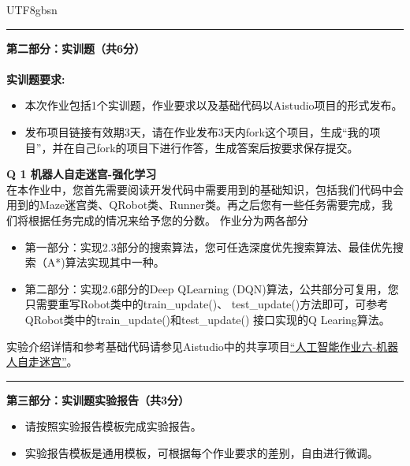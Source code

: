 \documentclass[a4paper, 11pt]{article}
\newenvironment{problem}[2][Q]
    { \begin{mdframed}[backgroundcolor=gray!20] \textbf{#1 #2} \\}
    {  \end{mdframed}}
\begin{document}
\begin{CJK}{UTF8}{gbsn}



\noindent\rule{7in}{1pt}
\textbf{第二部分：实训题（共6分）}
\\ \\
\textbf{实训题要求:}
\begin{itemize}
    \item 本次作业包括1个实训题，作业要求以及基础代码以Aistudio项目的形式发布。
    \item 发布项目链接有效期3天，请在作业发布3天内fork这个项目，生成``我的项目''，并在自己fork的项目下进行作答，生成答案后按要求保存提交。
\end{itemize}


\begin{problem}{1 机器人自走迷宫-强化学习}

在本作业中，您首先需要阅读开发代码中需要用到的基础知识，包括我们代码中会用到的Maze迷宫类、QRobot类、Runner类。再之后您有一些任务需要完成，我们将根据任务完成的情况来给予您的分数。  
作业分为两各部分
\begin{itemize}
    \item 第一部分：实现2.3部分的搜索算法，您可任选深度优先搜索算法、最佳优先搜索（A*)算法实现其中一种。
    \item 第二部分：实现2.6部分的Deep QLearning (DQN)算法，公共部分可复用，您只需要重写Robot类中的train\_update()、 test\_update()方法即可，可参考QRobot类中的train\_update()和test\_update() 接口实现的Q Learing算法。
\end{itemize}
实验介绍详情和参考基础代码请参见Aistudio中的共享项目\href{https://aistudio.baidu.com/studio/project/partial/verify/5522785/61f8ecf180ac43398f90e36520c41018}{“人工智能作业六-机器人自走迷宫”}。
\end{problem}

\noindent\rule{7in}{1pt}
\textbf{第三部分：实训题实验报告（共3分）}
\begin{itemize}
    \item 请按照实验报告模板完成实验报告。
    \item 实验报告模板是通用模板，可根据每个作业要求的差别，自由进行微调。
\end{itemize}

\end{CJK}
\end{document}
